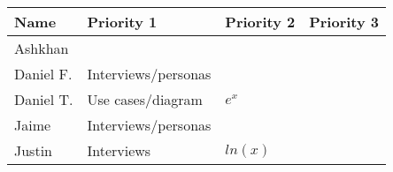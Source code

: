 \documentclass{article}
\begin{document}
\begin{table}[]
\begin{tabular}{|l|l|l|l|}
\hline
 \textbf{Name}&\textbf{Priority 1}  &\textbf{Priority 2}  &\textbf{Priority 3}  \\ \hline
 Ashkhan&  &  &  \\ \hline
 Daniel F.&Interviews/personas  &  &  \\ \hline
 Daniel T.&Use cases/diagram  &$e^x$  &  \\ \hline
 Jaime&Interviews/personas  &  &  \\ \hline
 Justin&Interviews  &$ln(x)$  &  \\ \hline
\end{tabular}
\end{table}
\end{document}
